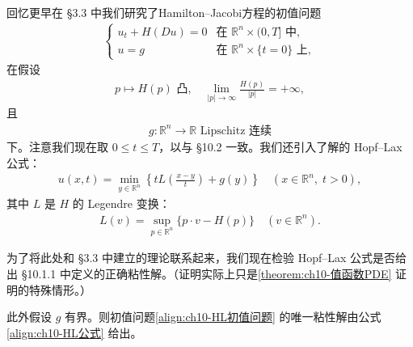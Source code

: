 \documentclass[../../main.tex]{subfiles}
\begin{document}
回忆更早在 \S3.3 中我们研究了Hamilton--Jacobi方程的初值问题
\begin{align}
\begin{cases}
u_t+H(Du)=0 & \text{在 } \mathbb{R}^n\times(0,T] \text{ 中},\\
u=g & \text{在 } \mathbb{R}^n\times\{t=0\} \text{ 上},
\end{cases}
\label{align:ch10-HL初值问题}
\end{align}
在假设
\begin{align*}
p\mapsto H(p)\text{ 凸},\quad \lim_{|p|\to\infty}\frac{H(p)}{|p|}=+\infty,
\end{align*}
且
\begin{align*}
g:\mathbb{R}^n\to\mathbb{R}\text{ Lipschitz 连续}
\end{align*}
下。注意我们现在取 $0\leqslant t\leqslant T$，以与 \S10.2 一致。我们还引入了解的 Hopf--Lax 公式：
\begin{align}
u(x,t)=\min_{y\in\mathbb{R}^n}\left\{tL\left(\frac{x-y}{t}\right)+g(y)\right\} \quad (x\in\mathbb{R}^n,\;t>0),
\label{align:ch10-HL公式}
\end{align}
其中 $L$ 是 $H$ 的 Legendre 变换：
\begin{align}
L(v)=\sup_{p\in\mathbb{R}^n}\{p\cdot v-H(p)\} \quad (v\in\mathbb{R}^n).
\label{align:ch10-Legendre变换}
\end{align}

为了将此处和 \S3.3 中建立的理论联系起来，我们现在检验 Hopf--Lax 公式是否给出 \S10.1.1 中定义的正确粘性解。（证明实际上只是\cref{theorem:ch10-值函数PDE} 证明的特殊情形。）

\begin{theorem}\label{theorem:ch10-HL公式粘性解}此外假设 $g$ 有界。则初值问题\eqref{align:ch10-HL初值问题} 的唯一粘性解由公式\eqref{align:ch10-HL公式} 给出。
\end{theorem}
\end{document}
